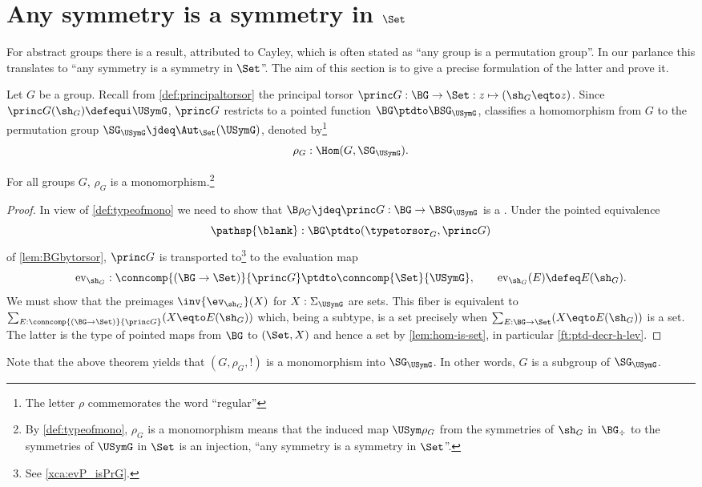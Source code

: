 \section{Any symmetry is a symmetry in $\Set$}
\label{sec:groupssubperm}


For abstract groups there is a result, attributed to Cayley,
which is often stated as ``any group is a permutation group''. 
In our parlance this translates to ``any symmetry is a symmetry in $\Set$''.
The aim of this section is to give a precise formulation of the latter
and prove it.

Let $G$ be a group.
Recall from \cref{def:principaltorsor} the principal torsor
$\princ G:\BG\to\Set: z\mapsto (\sh_G\eqto z)$.
Since $\princ G (\sh_G)\defequi \USymG$, $\princ G$ restricts to
a pointed function $\BG\ptdto \BSG_{\USymG}$, \ie 
classifies a homomorphism from $G$ to the permutation group 
$\SG_{\USymG}\jdeq \Aut_{\Set}(\USymG)$,
denoted by\footnote{The letter $\rho$ commemorates the word ``regular''} 
$$\rho_G:\Hom(G,\SG_{\USymG}).$$

\begin{theorem}[Cayley]
  \label{lem:allgpsarepermutationgps}
  For all groups $G$, $\rho_G$ is a monomorphism.\footnote{By
  \cref{def:typeofmono}, $\rho_G$ is a monomorphism means 
  that the induced map $\USym\rho_G$ from the symmetries of $\sh_G$ in 
  $\BG_\div$ to the symmetries of $\USymG$ in $\Set$ is an injection, 
  \ie ``any symmetry is a symmetry in $\Set$''.}  
\end{theorem}

\begin{proof}
  In view of \cref{def:typeofmono} we need to show that 
  $\B\rho_G\jdeq\princ G :\BG \to \BSG_{\USymG}$ is a \covering.
  Under the pointed equivalence
  $$\pathsp{\blank}:\BG\ptdto (\typetorsor_G,\princ G)$$ of
  \cref{lem:BGbytorsor}, $\princ G$ is transported to\footnote{
  See \cref{xca:evP_isPrG}.} to the
  evaluation map
  $$\mathrm{ev}_{\sh_G}:\conncomp{(\BG\to\Set)}{\princ G}\ptdto
  \conncomp{\Set}{\USymG},\qquad
  \mathrm{ev}_{\sh_G}(E)\defeq E(\sh_G).$$
  We must show that the preimages
  $\inv{\ev_{\sh_G}}(X)$ for $X:\Sigma_{\USymG}$ are sets.  This
  fiber is equivalent to
  $\sum_{E:\conncomp{(\BG\to\Set)}{\princ G}}(X\eqto E(\sh_G))$ which,
  being a subtype, is a
  set precisely when $\sum_{E:\BG\to\Set}(X\eqto E(\sh_G))$ is a set.
  The latter is the type of pointed maps from $\BG$ to $(\Set,X)$
  and hence a set by \cref{lem:hom-is-set}, 
  in particular \cref{ft:ptd-decr-h-lev}.
\end{proof}
  Note that the above theorem yields that 
  $(G,\rho_G,!)$ is a monomorphism into $\SG_{\USymG}$.
  In other words, $G$ is a subgroup of $\SG_{\USymG}$.


